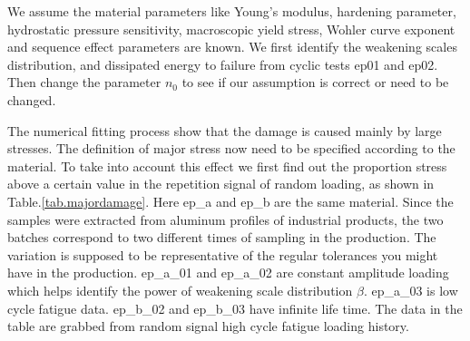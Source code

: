 We assume the material parameters like Young's modulus, hardening parameter, hydrostatic pressure sensitivity, macroscopic yield stress, Wohler curve exponent and sequence effect parameters are known. We first identify the weakening scales distribution, and dissipated energy to failure from cyclic tests ep01 and ep02. Then change the parameter $n_0$ to see if our assumption is correct or need to be changed. 


The numerical fitting process show that the damage is caused mainly by large stresses. The definition of major stress now need to be specified according to the material. To take into account this effect we first find out the proportion stress above a certain value in the repetition signal of random loading, as shown in Table.\ref{tab.majordamage}.  Here ep\_a and ep\_b are the same material. Since the samples were extracted from aluminum profiles of industrial products,  the two batches correspond to two different times of sampling in the production. The variation is supposed to be representative of the regular tolerances you might have in the production. ep\_a\_01 and ep\_a\_02 are constant amplitude loading which helps identify the power of weakening scale distribution $\beta$. ep\_a\_03 is low cycle fatigue data.  ep\_b\_02 and ep\_b\_03 have infinite life time. The data in the table are grabbed from random signal high cycle fatigue loading history.

